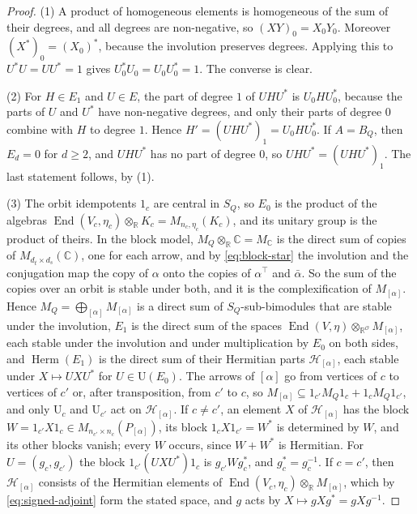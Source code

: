 \documentclass[12pt, a4paper]{report}
\theoremstyle{plain}
\theoremstyle{definition}
\theoremstyle{remark}
\theoremstyle{plain}
\newcommand{\RR}{\mathbb{R}}
\newcommand{\CC}{\mathbb{C}}
\newcommand{\Un}{\mathrm{U}}
\newcommand{\Herm}{\operatorname{Herm}}
\DeclareMathOperator{\End}{End}
\begin{document}
\begin{proof}
(1) A product of homogeneous elements is homogeneous of the sum of their degrees, and all degrees are non-negative, so $(XY)_0=X_0Y_0$. Moreover $(X^*)_0=(X_0)^*$, because the involution preserves degrees. Applying this to $U^*U=UU^*=1$ gives $U_0^*U_0=U_0U_0^*=1$. The converse is clear.

(2) For $H\in E_1$ and $U\in E$, the part of degree $1$ of $UHU^*$ is $U_0HU_0^*$, because the parts of $U$ and $U^*$ have non-negative degrees, and only their parts of degree $0$ combine with $H$ to degree $1$. Hence $H'=(UHU^*)_1=U_0HU_0^*$. If $A=B_Q$, then $E_d=0$ for $d\geq2$, and $UHU^*$ has no part of degree $0$, so $UHU^*=(UHU^*)_1$. The last statement follows, by (1).

(3) The orbit idempotents $1_c$ are central in $S_Q$, so $E_0$ is the product of the algebras $\End(V_c,\eta_c)\otimes_\RR K_c=M_{n_c,\eta_c}(K_c)$, and its unitary group is the product of theirs. In the block model, $M_Q\otimes_\RR\CC=M_\CC$ is the direct sum of copies of $M_{d_t\times d_s}(\CC)$, one for each arrow, and by \eqref{eq:block-star} the involution and the conjugation map the copy of $\alpha$ onto the copies of $\alpha^{\top}$ and $\bar\alpha$. So the sum of the copies over an orbit is stable under both, and it is the complexification of $M_{[\alpha]}$. Hence $M_Q=\bigoplus_{[\alpha]}M_{[\alpha]}$ is a direct sum of $S_Q$-sub-bimodules that are stable under the involution, $E_1$ is the direct sum of the spaces $\End(V,\eta)\otimes_{\RR^{\mathcal O}}M_{[\alpha]}$, each stable under the involution and under multiplication by $E_0$ on both sides, and $\Herm(E_1)$ is the direct sum of their Hermitian parts $\mathcal H_{[\alpha]}$, each stable under $X\mapsto UXU^*$ for $U\in\Un(E_0)$. The arrows of $[\alpha]$ go from vertices of $c$ to vertices of $c'$ or, after transposition, from $c'$ to $c$, so $M_{[\alpha]}\subseteq1_{c'}M_Q1_c+1_cM_Q1_{c'}$, and only $\Un_c$ and $\Un_{c'}$ act on $\mathcal H_{[\alpha]}$. If $c\neq c'$, an element $X$ of $\mathcal H_{[\alpha]}$ has the block $W=1_{c'}X1_c\in M_{n_{c'}\times n_c}(P_{[\alpha]})$, its block $1_cX1_{c'}=W^*$ is determined by $W$, and its other blocks vanish; every $W$ occurs, since $W+W^*$ is Hermitian. For $U=(g_c,g_{c'})$ the block $1_{c'}(UXU^*)1_c$ is $g_{c'}Wg_c^*$, and $g_c^*=g_c^{-1}$. If $c=c'$, then $\mathcal H_{[\alpha]}$ consists of the Hermitian elements of $\End(V_c,\eta_c)\otimes_\RR M_{[\alpha]}$, which by \eqref{eq:signed-adjoint} form the stated space, and $g$ acts by $X\mapsto gXg^*=gXg^{-1}$.
\end{proof}
\end{document}
